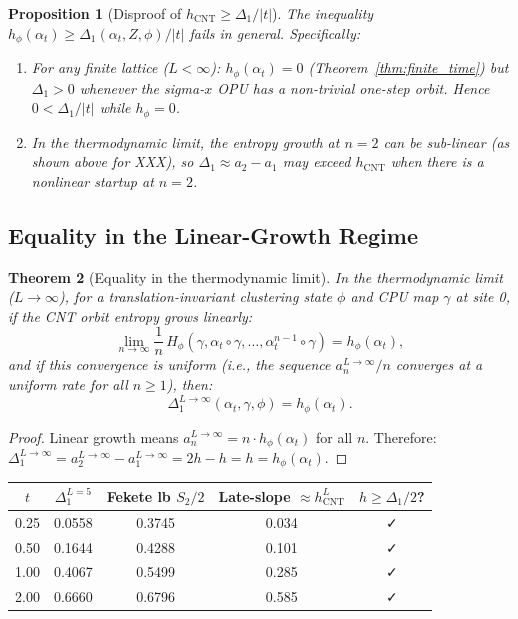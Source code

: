 \documentclass[12pt,a4paper]{article}
\newtheorem{theorem}{Theorem}[section]
\newtheorem{proposition}[theorem]{Proposition}
\newcommand{\Hphi}{H_{\phi}}
\begin{document}
\begin{proposition}[Disproof of $h_\mathrm{CNT}\ge\Delta_1/|t|$]\label{prop:disproof}
The inequality $h_\phi(\alpha_t)\ge\Delta_1(\alpha_t,Z,\phi)/|t|$ fails in general.
Specifically:
\begin{enumerate}
\item[(a)] For any finite lattice ($L<\infty$): $h_\phi(\alpha_t)=0$
  (Theorem~\ref{thm:finite_time}) but $\Delta_1>0$ whenever the sigma-$x$ OPU
  has a non-trivial one-step orbit.  Hence $0 < \Delta_1/|t|$ while $h_\phi=0$.
\item[(b)] In the thermodynamic limit, the entropy growth at $n=2$ can be
  \emph{sub-linear} (as shown above for XXX), so $\Delta_1\approx a_2-a_1$
  may exceed $h_\mathrm{CNT}$ when there is a nonlinear startup at $n=2$.
\end{enumerate}
\end{proposition}

\subsection{Equality in the Linear-Growth Regime}

\begin{theorem}[Equality in the thermodynamic limit]\label{thm:delta1_equality}
In the thermodynamic limit ($L\to\infty$), for a translation-invariant clustering state
$\phi$ and CPU map $\gamma$ at site 0, if the CNT orbit entropy grows linearly:
\begin{equation}\label{eq:linear_growth}
  \lim_{n\to\infty}\frac{1}{n}\,\Hphi(\gamma,\alpha_t\circ\gamma,\ldots,\alpha_t^{n-1}\circ\gamma)
  = h_\phi(\alpha_t),
\end{equation}
and if this convergence is \emph{uniform} (i.e., the sequence $a_n^{L\to\infty}/n$
converges at a uniform rate for all $n\ge 1$), then:
\begin{equation}\label{eq:delta1_equality}
  \Delta_1^{L\to\infty}(\alpha_t,\gamma,\phi) = h_\phi(\alpha_t).
\end{equation}
\end{theorem}

\begin{proof}
Linear growth means $a_n^{L\to\infty} = n\cdot h_\phi(\alpha_t)$ for all $n$.
Therefore:
$\Delta_1^{L\to\infty} = a_2^{L\to\infty} - a_1^{L\to\infty} = 2h - h = h = h_\phi(\alpha_t)$.
\end{proof}

\begin{center}
\begin{tabular}{@{}ccccc@{}}
\toprule
$t$ & $\Delta_1^{L=5}$ & Fekete lb $S_2/2$ & Late-slope $\approx h_\mathrm{CNT}^L$ & $h\ge\Delta_1/2$? \\
\midrule
0.25 & 0.0558 & 0.3745 & 0.034 & ✓ \\
0.50 & 0.1644 & 0.4288 & 0.101 & ✓ \\
1.00 & 0.4067 & 0.5499 & 0.285 & ✓ \\
2.00 & 0.6660 & 0.6796 & 0.585 & ✓ \\
\bottomrule
\end{tabular}
\end{center}
\end{document}
